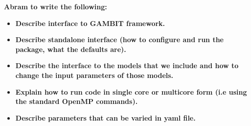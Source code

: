 \textbf{Abram to write the following:}

\begin{itemize}
\item \textbf{Describe interface to GAMBIT framework.}
\item \textbf{Describe standalone interface (how to configure and run the package, what the defaults are).}
\item \textbf{Describe the interface to the models that we include and how to change the input parameters of those models.}
\item \textbf{Explain how to run code in single core or multicore form (i.e using the standard OpenMP commands).}
\item \textbf{Describe parameters that can be varied in yaml file.}
\end{itemize}
